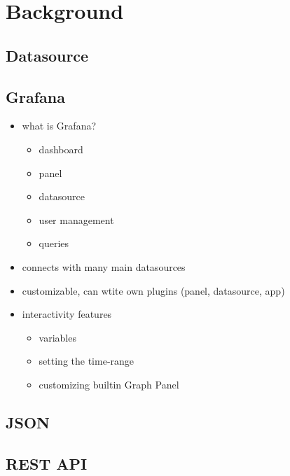 \chapter{Background}

\section{Datasource}

\section{Grafana}

\begin{itemize}
	\item what is Grafana?
	\begin{itemize}
		\item dashboard
		\item panel
		\item datasource
		\item user management
		\item queries
	\end{itemize}
	\item connects with many main datasources
	\item customizable, can wtite own plugins (panel, datasource, app)
	\item interactivity features
	\begin{itemize}
		\item variables
		\item setting the time-range
		\item customizing builtin Graph Panel
	\end{itemize}
\end{itemize}

\section{JSON}

\section{REST API}
